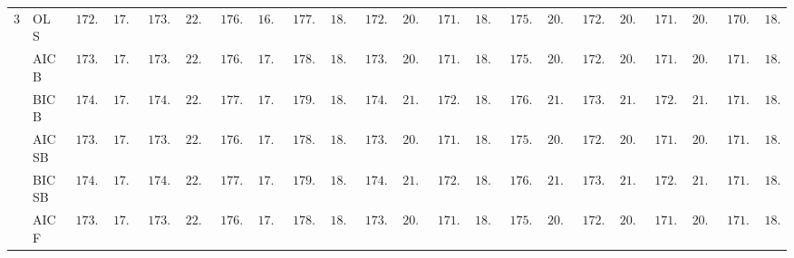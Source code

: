 \begin{tabular}{p{0.2cm}p{1cm}|p{0.6cm}p{0.6cm}|p{0.6cm}p{0.6cm}p{0.6cm}p{0.6cm}p{0.6cm}p{0.6cm}|p{0.6cm}p{0.6cm}p{0.6cm}p{0.6cm}p{0.6cm}p{0.6cm}|p{0.6cm}p{0.6cm}p{0.6cm}p{0.6cm}p{0.6cm}p{0.6cm}}
3 & OLS  & $\phantom{0}172.72$ & $\phantom{0}17.53$ & $\phantom{0}173.36$ & $\phantom{0}22.37$ & $\phantom{0}176.24$ & $\phantom{0}16.97$ & $\phantom{0}177.45$ & $\phantom{0}18.24$ & $\phantom{0}172.85$ & $\phantom{0}20.81$ & $\phantom{0}171.38$ & $\phantom{0}18.49$ & $\phantom{0}175.25$ & $\phantom{0}20.84$ & $\phantom{0}172.15$ & $\phantom{0}20.80$ & $\phantom{0}171.37$ & $\phantom{0}20.88$ & $\phantom{0}170.51$ & $\phantom{0}18.58$ \\
 & AIC B  & $\phantom{0}173.23$ & $\phantom{0}17.57$ & $\phantom{0}173.81$ & $\phantom{0}22.42$ & $\phantom{0}176.74$ & $\phantom{0}17.02$ & $\phantom{0}178.06$ & $\phantom{0}18.32$ & $\phantom{0}173.34$ & $\phantom{0}20.89$ & $\phantom{0}171.82$ & $\phantom{0}18.52$ & $\phantom{0}175.78$ & $\phantom{0}20.90$ & $\phantom{0}172.66$ & $\phantom{0}20.86$ & $\phantom{0}171.85$ & $\phantom{0}20.92$ & $\phantom{0}171.00$ & $\phantom{0}18.60$ \\
 & BIC B  & $\phantom{0}174.33$ & $\phantom{0}17.71$ & $\phantom{0}174.93$ & $\phantom{0}22.61$ & $\phantom{0}177.87$ & $\phantom{0}17.22$ & $\phantom{0}179.02$ & $\phantom{0}18.31$ & $\phantom{0}174.65$ & $\phantom{0}21.00$ & $\phantom{0}172.90$ & $\phantom{0}18.73$ & $\phantom{0}176.83$ & $\phantom{0}21.01$ & $\phantom{0}173.67$ & $\phantom{0}21.06$ & $\phantom{0}172.95$ & $\phantom{0}21.01$ & $\phantom{0}171.95$ & $\phantom{0}18.67$ \\
 & AIC SB  & $\phantom{0}173.23$ & $\phantom{0}17.57$ & $\phantom{0}173.81$ & $\phantom{0}22.42$ & $\phantom{0}176.74$ & $\phantom{0}17.02$ & $\phantom{0}178.06$ & $\phantom{0}18.32$ & $\phantom{0}173.34$ & $\phantom{0}20.89$ & $\phantom{0}171.82$ & $\phantom{0}18.52$ & $\phantom{0}175.78$ & $\phantom{0}20.90$ & $\phantom{0}172.66$ & $\phantom{0}20.86$ & $\phantom{0}171.85$ & $\phantom{0}20.92$ & $\phantom{0}171.00$ & $\phantom{0}18.60$ \\
 & BIC SB  & $\phantom{0}174.33$ & $\phantom{0}17.71$ & $\phantom{0}174.93$ & $\phantom{0}22.61$ & $\phantom{0}177.87$ & $\phantom{0}17.22$ & $\phantom{0}179.02$ & $\phantom{0}18.31$ & $\phantom{0}174.65$ & $\phantom{0}21.00$ & $\phantom{0}172.87$ & $\phantom{0}18.71$ & $\phantom{0}176.83$ & $\phantom{0}21.01$ & $\phantom{0}173.67$ & $\phantom{0}21.06$ & $\phantom{0}172.95$ & $\phantom{0}21.01$ & $\phantom{0}171.95$ & $\phantom{0}18.67$ \\
 & AIC F  & $\phantom{0}173.23$ & $\phantom{0}17.57$ & $\phantom{0}173.84$ & $\phantom{0}22.43$ & $\phantom{0}176.76$ & $\phantom{0}17.03$ & $\phantom{0}178.14$ & $\phantom{0}18.35$ & $\phantom{0}173.35$ & $\phantom{0}20.89$ & $\phantom{0}171.88$ & $\phantom{0}18.53$ & $\phantom{0}175.99$ & $\phantom{0}20.94$ & $\phantom{0}172.66$ & $\phantom{0}20.85$ & $\phantom{0}171.87$ & $\phantom{0}20.90$ & $\phantom{0}171.12$ & $\phantom{0}18.64$ \\

\end{tabular}
